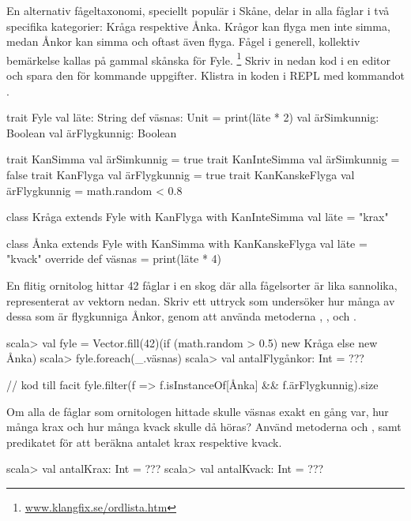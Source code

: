 En alternativ fågeltaxonomi, speciellt populär i Skåne, delar in alla fåglar i två specifika kategorier: Kråga respektive Ånka. Krågor kan flyga men inte simma, medan Ånkor kan simma och oftast även flyga. Fågel i generell, kollektiv bemärkelse kallas på gammal skånska för Fyle.%
\footnote{\href{http://www.klangfix.se/ordlista.htm}{www.klangfix.se/ordlista.htm}}
Skriv in nedan kod i en editor och spara den för kommande uppgifter. Klistra in koden i REPL med kommandot .

\begin{Code}
trait Fyle { 
  val läte: String
  def väsnas: Unit = print(läte * 2)
  val ärSimkunnig: Boolean
  val ärFlygkunnig: Boolean
}

trait KanSimma       { val ärSimkunnig = true }
trait KanInteSimma   { val ärSimkunnig = false }
trait KanFlyga       { val ärFlygkunnig = true }
trait KanKanskeFlyga { val ärFlygkunnig = math.random < 0.8 }

class Kråga extends Fyle with KanFlyga with KanInteSimma {
  val läte = "krax"  
} 

class Ånka extends Fyle with KanSimma with KanKanskeFlyga {
  val läte = "kvack"
  override def väsnas = print(läte * 4)
} 
\end{Code}

\Subtask En flitig ornitolog hittar 42 fåglar i en skog där alla fågelsorter är lika sannolika, representerat av vektorn  nedan. Skriv ett uttryck som undersöker hur många av dessa som är flygkunniga Ånkor, genom att använda metoderna , ,  och .   
\begin{REPL}
scala> val fyle = 
         Vector.fill(42)(if (math.random > 0.5) new Kråga else new Ånka)
scala> fyle.foreach(_.väsnas)
scala> val antalFlygånkor: Int = ??? 
\end{REPL}

\begin{Code}
// kod till facit
fyle.filter(f => f.isInstanceOf[Ånka] && f.ärFlygkunnig).size
\end{Code}

\Subtask Om alla de fåglar som ornitologen hittade skulle väsnas exakt en gång var, hur många krax och hur många kvack skulle då höras? Använd metoderna  och , samt predikatet  för att beräkna antalet krax respektive kvack.
\begin{REPL}
scala> val antalKrax: Int = ???
scala> val antalKvack: Int = ??? 
\end{REPL}

